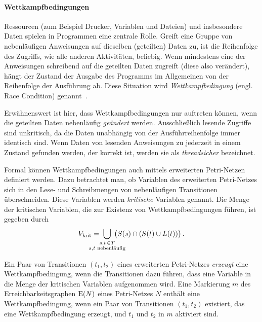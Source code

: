 \paragraph{Wettkampfbedingungen}
Ressourcen (zum Beispiel Drucker, Variablen und Dateien) und insbesondere Daten spielen in Programmen eine zentrale Rolle. Greift eine Gruppe von nebenläufigen Anweisungen auf dieselben (geteilten) Daten zu, ist die Reihenfolge des Zugriffs, wie alle anderen Aktivitäten, beliebig. Wenn mindestens eine der Anweisungen schreibend auf die geteilten Daten zugreift (diese also verändert), hängt der Zustand der Ausgabe des Programms im Allgemeinen von der Reihenfolge der Ausführung ab. Diese Situation wird \emph{Wettkampfbedingung} (engl. Race Condition) genannt~\cite{Hettel2016}. 

Erwähnenswert ist hier, dass Wettkampfbedingungen nur auftreten können, wenn die geteilten Daten nebenläufig \emph{geändert} werden. Ausschließlich lesende Zugriffe sind unkritisch, da die Daten unabhängig von der Ausführreihenfolge immer identisch sind. Wenn Daten von lesenden Anweisungen zu jederzeit in einem Zustand gefunden werden, der korrekt ist, werden sie als \emph{threadsicher} bezeichnet.

Formal können Wettkampfbedingungen auch mittels erweiterten Petri-Netzen definiert werden. Dazu betrachtet man, ob Variablen des erweiterten Petri-Netzes sich in den Lese- und Schreibmengen von nebenläufigen Transitionen überschneiden. Diese Variablen werden \emph{kritische} Variablen genannt. Die Menge der kritischen Variablen, die zur Existenz von Wettkampfbedingungen führen, ist gegeben durch
\begin{align*}
	V_\text{krit} = \;\bigcup_{\mathclap{\substack{s,t\, \in T\\s, t \text{ nebenläufig}}}} \;\left( \strut{S(s) \cap (S(t) \cup L(t))}\right).
\end{align*}

Ein Paar von Transitionen $(t_1, t_2)$ eines erweiterten Petri-Netzes \emph{erzeugt} eine Wettkampfbedingung, wenn die Transitionen dazu führen, dass eine Variable in die Menge der kritischen Variablen aufgenommen wird. Eine Markierung $m$ des Erreichbarkeitsgraphen $\operatorname{E}(N)$ eines Petri-Netzes $N$ enthält eine Wettkampfbedingung, wenn ein Paar von Transitionen $(t_1, t_2)$ existiert, das eine Wettkampfbedingung erzeugt, und $t_1$ und $t_2$ in $m$ aktiviert sind.

